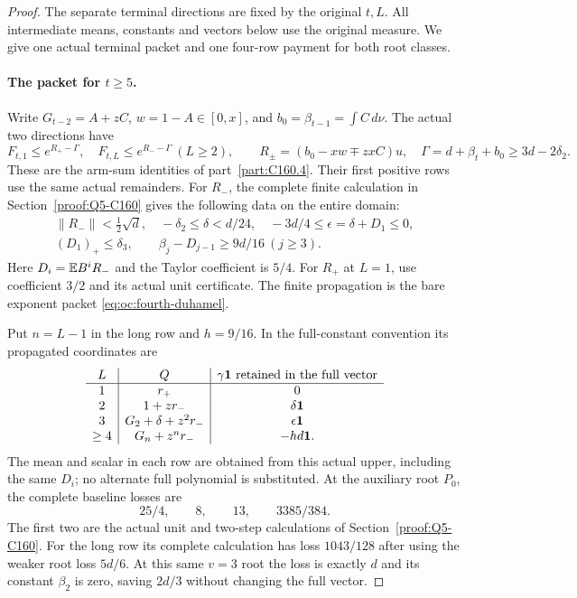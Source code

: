 \begin{proof}
The separate terminal directions are fixed by the original $t,L$.
All intermediate means, constants and vectors below use the original
measure. We give one actual terminal packet and one four-row payment
for both root classes.

\paragraph{The packet for $t\ge5$.}
Write $G_{t-2}=A+zC$, $w=1-A\in[0,x]$, and
$b_0=\beta_{t-1}=\int C\,d\nu$. The actual two directions have
\[
 F_{t,1}\le e^{R_+-\Gamma},\quad
 F_{t,L}\le e^{R_--\Gamma}\ (L\ge2),\qquad
 R_\pm=(b_0-xw\mp zxC)u,
 \quad\Gamma=d+\beta_t+b_0\ge3d-2\delta_2.
\]
These are the arm-sum identities of part~\ref{part:C160.4}.
Their first positive rows use the same actual remainders.
For $R_-$, the complete finite calculation in Section~\ref{proof:Q5-C160}
gives the following data on the entire domain:
\[
 \begin{gathered}
 \|R_-\|<\tfrac12\sqrt d,\quad
 -\delta_2\le\delta<d/24,\quad
 -3d/4\le\epsilon=\delta+D_1\le0,\\
 (D_1)_+\le\delta_3,\qquad
 \beta_j-D_{j-1}\ge9d/16\ (j\ge3).
 \end{gathered}
\]
Here $D_i=\mathbb E B^iR_-$ and the Taylor coefficient is $5/4$.
For $R_+$ at $L=1$, use coefficient $3/2$ and its actual unit
certificate. The finite propagation is the bare exponent packet
\eqref{eq:oc:fourth-duhamel}.

Put $n=L-1$ in the long row and $h=9/16$.
In the full-constant convention its propagated coordinates are
\begin{equation}\label{eq:odd-three:actual-rows}
\begin{array}{c|c|c}
 L&Q&\gamma\mathbf1\text{ retained in the full vector}\\\hline
 1&r_+&0\\
 2&1+zr_-&\delta\mathbf1\\
 3&G_2+\delta+z^2r_-&\epsilon\mathbf1\\
 \ge4&G_n+z^nr_-&-hd\mathbf1.
\end{array}
\end{equation}
The mean and scalar in each row are obtained from this actual upper,
including the same $D_i$; no alternate full polynomial is substituted.
At the auxiliary root $P_0$, the complete baseline losses are
\begin{equation}\label{eq:odd-three:baselines}
 25/4,\qquad8,\qquad13,\qquad3385/384.
\end{equation}
The first two are the actual unit and two-step calculations of
Section~\ref{proof:Q5-C160}. For the long row its complete calculation
has loss $1043/128$ after using the weaker root loss $5d/6$.
At this same $v=3$ root the loss is exactly $d$ and its constant
$\beta_2$ is zero, saving $2d/3$ without changing the full vector.


\end{proof}
